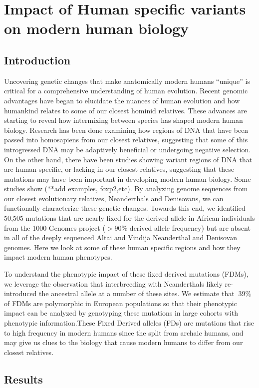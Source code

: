 \chapter{Impact of Human specific variants on modern human biology}
\section{Introduction}
Uncovering genetic changes that make anatomically modern humans “unique” is critical for a comprehensive understanding of human evolution. Recent genomic advantages have began to elucidate the nuances of human evolution and how humankind relates to some of our closest hominid relatives. These advances are starting to reveal how intermixing between species has shaped modern human biology. Research has been done examining how regions of DNA that have been passed into homosapiens from our closest relatives, suggesting that some of this introgressed DNA may be adaptively beneficial or undergoing negative selection. On the other hand, there have been studies showing variant regions of DNA that are human-specific, or lacking in our closest relatives, suggesting that these mutations may have been important in developing modern human biology. Some studies show (**add examples, foxp2,etc).
By analyzing genome sequences from our closest evolutionary relatives, Neanderthals and Denisovans, we can functionally characterize these genetic changes. Towards this end, we identified 50,505 mutations that are nearly fixed for the derived allele in African individuals from the 1000 Genomes project ($>90\%$ derived allele frequency) but are absent in all of the deeply sequenced Altai and Vindija Neanderthal and Denisovan genomes. Here we look at some of these human specific regions and how they impact modern human phenotypes.

To understand the phenotypic impact of these fixed derived mutations (FDMs), we leverage the observation that interbreeding with Neanderthals likely re-introduced the ancestral allele at a number of these sites. We estimate that $~39\%$ of FDMs are polymorphic in European populations so that their phenotypic impact can be analyzed by genotyping these mutations in large cohorts with phenotypic information.These Fixed Derived alleles (FDs) are mutations that rise to high frequency  in  modern  humans  since  the  split  from  archaic humans, and may give us clues to the biology that cause modern humans to differ from our closest relatives.
\section{Results}
